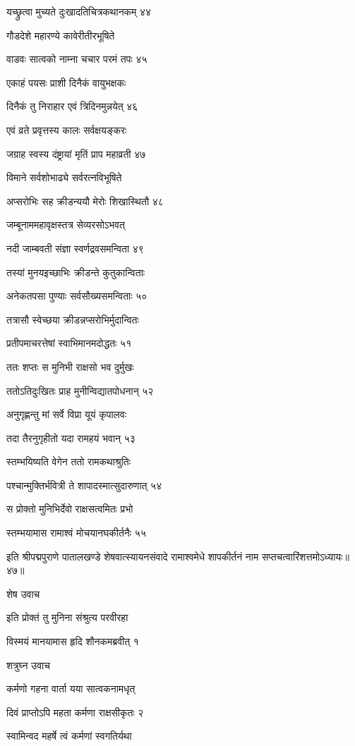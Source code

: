 यच्छ्रुत्वा मुच्यते दुःखादतिचित्रकथानकम् ४४

गौडदेशे महारण्ये कावेरीतीरभूषिते

वाडवः सात्वको नाम्ना चचार परमं तपः ४५

एकाहं पयसः प्राशी दिनैकं वायुभक्षकः

दिनैकं तु निराहार एवं त्रिदिनमुन्नयेत् ४६

एवं व्रते प्रवृत्तस्य कालः सर्वक्षयङ्करः

जग्राह स्वस्य दंष्ट्रायां मृतिं प्राप महाव्रती ४७

विमाने सर्वशोभाढ्ये सर्वरत्नविभूषिते

अप्सरोभिः सह क्रीडन्ययौ मेरोः शिखास्थितौ ४८

जम्बूनाममहावृक्षस्तत्र सेव्यरसोऽभवत्

नदी जाम्बवती संज्ञा स्वर्णद्रवसमन्विता ४९

तस्यां मुनयइच्छाभिः क्रीडन्ते कुतुकान्विताः

अनेकतपसा पुण्याः सर्वसौख्यसमन्विताः ५०

तत्रासौ स्वेच्छया क्रीडन्नप्सरोभिर्मुदान्वितः

प्रतीपमाचरत्तेषां स्वाभिमानमदोद्धतः ५१

ततः शप्तः स मुनिभी राक्षसो भव दुर्मुखः

ततोऽतिदुःखितः प्राह मुनीन्विद्यातपोधनान् ५२

अनुगृह्णन्तु मां सर्वे विप्रा यूयं कृपालवः

तदा तैरनुगृहीतो यदा रामहयं भवान् ५३

स्तम्भयिष्यति वेगेन ततो रामकथाश्रुतिः

पश्चान्मुक्तिर्भवित्री ते शापादस्मात्सुदारुणात् ५४

स प्रोक्तो मुनिभिर्देवो राक्षसत्वमितः प्रभो

स्तम्भयामास रामाश्वं मोचयानघकीर्तनैः ५५

इति श्रीपद्मपुराणे पातालखण्डे शेषवात्स्यायनसंवादे रामाश्वमेधे शापकीर्तनं नाम सप्तचत्वारिंशत्तमोऽध्यायः॥४७॥


शेष उवाच

इति प्रोक्तं तु मुनिना संश्रुत्य परवीरहा

विस्मयं मानयामास हृदि शौनकमब्रवीत् १

शत्रुघ्न उवाच

कर्मणो गहना वार्ता यया सात्वकनामधृत्

दिवं प्राप्तोऽपि महता कर्मणा राक्षसीकृतः २

स्वामिन्वद महर्षे त्वं कर्मणां स्वगतिर्यथा


